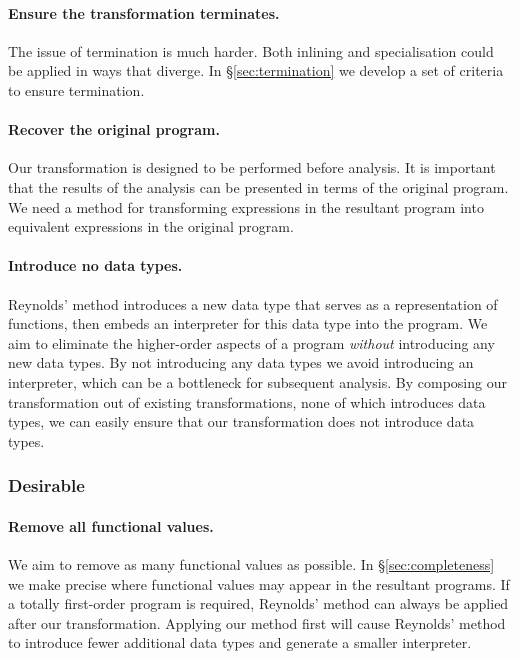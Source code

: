 \documentclass{sigplanconf}
\begin{document}
\paragraph{Ensure the transformation terminates.} The issue of termination is much harder. Both inlining and specialisation could be applied in ways that diverge. In \S\ref{sec:termination} we develop a set of criteria to ensure termination.

\paragraph{Recover the original program.} Our transformation is designed to be performed before analysis. It is important that the results of the analysis can be presented in terms of the original program. We need a method for transforming expressions in the resultant program into equivalent expressions in the original program.

\paragraph{Introduce no data types.} Reynolds' method introduces a new data type that serves as a representation of functions, then embeds an interpreter for this data type into the program. We aim to eliminate the higher-order aspects of a program \textit{without} introducing any new data types. By not introducing any data types we avoid introducing an interpreter, which can be a bottleneck for subsequent analysis. By composing our transformation out of existing transformations, none of which introduces data types, we can easily ensure that our transformation does not introduce data types.


\subsubsection*{Desirable}

\paragraph{Remove all functional values.} We aim to remove as many functional values as possible. In \S\ref{sec:completeness} we make precise where functional values may appear in the resultant programs. If a totally first-order program is required, Reynolds' method can always be applied after our transformation. Applying our method first will cause Reynolds' method to introduce fewer additional data types and generate a smaller interpreter.
\end{document}
